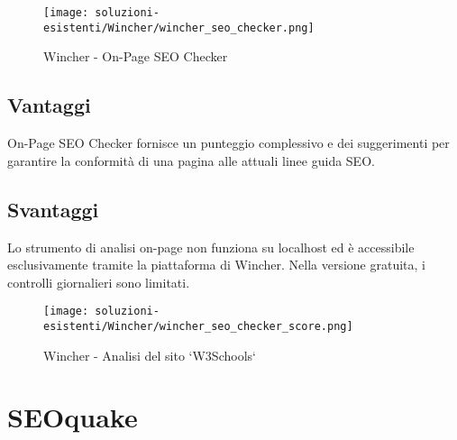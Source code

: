 \begin{figure}[H]
    \centering 
    \texttt{[image: soluzioni-esistenti/Wincher/wincher\_seo\_checker.png]} 
    \caption{Wincher - On-Page SEO Checker}
\end{figure}

\subsection{Vantaggi}
\par On-Page SEO Checker fornisce un punteggio complessivo e dei suggerimenti per garantire la conformità di una pagina alle attuali linee guida SEO.

\subsection{Svantaggi}
\par Lo strumento di analisi on-page non funziona su \gls{localhost} ed è accessibile esclusivamente tramite la piattaforma di Wincher. Nella versione gratuita, i controlli giornalieri sono limitati.

\begin{figure}[H]
    \centering 
    \texttt{[image: soluzioni-esistenti/Wincher/wincher\_seo\_checker\_score.png]} 
    \caption{Wincher - Analisi del sito `W3Schools`}
\end{figure}

\section{SEOquake}

